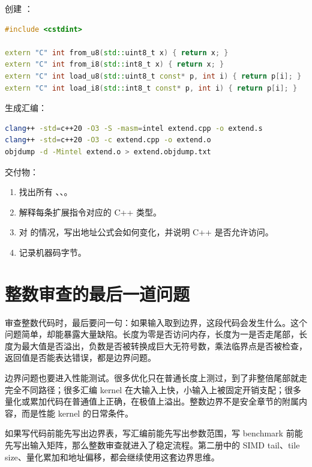 \begin{labbox}
创建 ：

\begin{lstlisting}[language=C++]
#include <cstdint>

extern "C" int from_u8(std::uint8_t x) { return x; }
extern "C" int from_i8(std::int8_t x) { return x; }
extern "C" int load_u8(std::uint8_t const* p, int i) { return p[i]; }
extern "C" int load_i8(std::int8_t const* p, int i) { return p[i]; }
\end{lstlisting}

生成汇编：

\begin{lstlisting}[language=bash]
clang++ -std=c++20 -O3 -S -masm=intel extend.cpp -o extend.s
clang++ -std=c++20 -O3 -c extend.cpp -o extend.o
objdump -d -Mintel extend.o > extend.objdump.txt
\end{lstlisting}

交付物：

\begin{enumerate}
  \item 找出所有 、、。
  \item 解释每条扩展指令对应的 C++ 类型。
  \item 对  的情况，写出地址公式会如何变化，并说明 C++ 是否允许访问。
  \item 记录机器码字节。
\end{enumerate}
\end{labbox}

\section{整数审查的最后一道问题}

审查整数代码时，最后要问一句：如果输入取到边界，这段代码会发生什么。这个问题简单，却能暴露大量缺陷。长度为零是否访问内存，长度为一是否走尾部，长度为最大值是否溢出，负数是否被转换成巨大无符号数，乘法临界点是否被检查，返回值是否能表达错误，都是边界问题。

边界问题也要进入性能测试。很多优化只在普通长度上测过，到了非整倍尾部就走完全不同路径；很多汇编 kernel 在大输入上快，小输入上被固定开销支配；很多量化或累加代码在普通值上正确，在极值上溢出。整数边界不是安全章节的附属内容，而是性能 kernel 的日常条件。

如果写代码前能先写出边界表，写汇编前能先写出参数范围，写 benchmark 前能先写出输入矩阵，那么整数审查就进入了稳定流程。第二册中的 SIMD tail、tile size、量化累加和地址偏移，都会继续使用这套边界思维。


